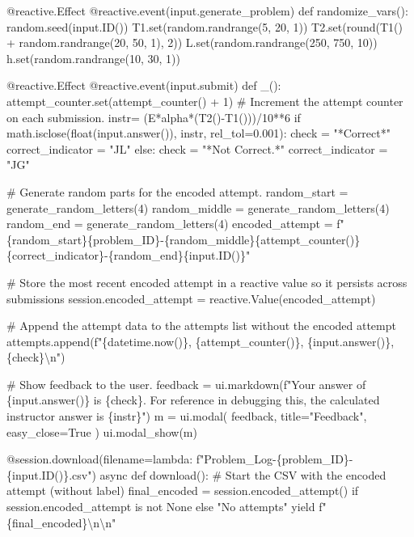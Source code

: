 \documentclass[
  letterpaper,
  DIV=11,
  numbers=noendperiod]{scrreprt}
\newenvironment{Shaded}{\begin{snugshade}}{\end{snugshade}}
\newcommand{\NormalTok}[1]{\textcolor[rgb]{0.00,0.23,0.31}{#1}}
\begin{document}
\begin{Shaded}
\begin{Highlighting}[]
\NormalTok{    @reactive.Effect}
\NormalTok{    @reactive.event(input.generate\_problem)}
\NormalTok{    def randomize\_vars():}
\NormalTok{        random.seed(input.ID())}
\NormalTok{        T1.set(random.randrange(5, 20, 1))}
\NormalTok{        T2.set(round(T1() + random.randrange(20, 50, 1), 2))}
\NormalTok{        L.set(random.randrange(250, 750, 10))}
\NormalTok{        h.set(random.randrange(10, 30, 1))}
       
        
\NormalTok{    @reactive.Effect}
\NormalTok{    @reactive.event(input.submit)}
\NormalTok{    def \_():}
\NormalTok{        attempt\_counter.set(attempt\_counter() + 1)  \# Increment the attempt counter on each submission.}
\NormalTok{        instr= (E*alpha*(T2(){-}T1()))/10**6}
\NormalTok{        if math.isclose(float(input.answer()), instr, rel\_tol=0.001):}
\NormalTok{            check = "*Correct*"}
\NormalTok{            correct\_indicator = "JL"}
\NormalTok{        else:}
\NormalTok{            check = "*Not Correct.*"}
\NormalTok{            correct\_indicator = "JG"}

\NormalTok{        \# Generate random parts for the encoded attempt.}
\NormalTok{        random\_start = generate\_random\_letters(4)}
\NormalTok{        random\_middle = generate\_random\_letters(4)}
\NormalTok{        random\_end = generate\_random\_letters(4)}
\NormalTok{        encoded\_attempt = f"\{random\_start\}\{problem\_ID\}{-}\{random\_middle\}\{attempt\_counter()\}\{correct\_indicator\}{-}\{random\_end\}\{input.ID()\}"}

\NormalTok{        \# Store the most recent encoded attempt in a reactive value so it persists across submissions}
\NormalTok{        session.encoded\_attempt = reactive.Value(encoded\_attempt)}

\NormalTok{        \# Append the attempt data to the attempts list without the encoded attempt}
\NormalTok{        attempts.append(f"\{datetime.now()\}, \{attempt\_counter()\}, \{input.answer()\}, \{check\}\textbackslash{}n")}

\NormalTok{        \# Show feedback to the user.}
\NormalTok{        feedback = ui.markdown(f"Your answer of \{input.answer()\} is \{check\}. For reference in debugging this, the calculated instructor answer is \{instr\}")}
\NormalTok{        m = ui.modal(}
\NormalTok{            feedback,}
\NormalTok{            title="Feedback",}
\NormalTok{            easy\_close=True}
\NormalTok{        )}
\NormalTok{        ui.modal\_show(m)}

\NormalTok{    @session.download(filename=lambda: f"Problem\_Log{-}\{problem\_ID\}{-}\{input.ID()\}.csv")}
\NormalTok{    async def download():}
\NormalTok{        \# Start the CSV with the encoded attempt (without label)}
\NormalTok{        final\_encoded = session.encoded\_attempt() if session.encoded\_attempt is not None else "No attempts"}
\NormalTok{        yield f"\{final\_encoded\}\textbackslash{}n\textbackslash{}n"}
        

\end{Highlighting}
\end{Shaded}
\end{document}
